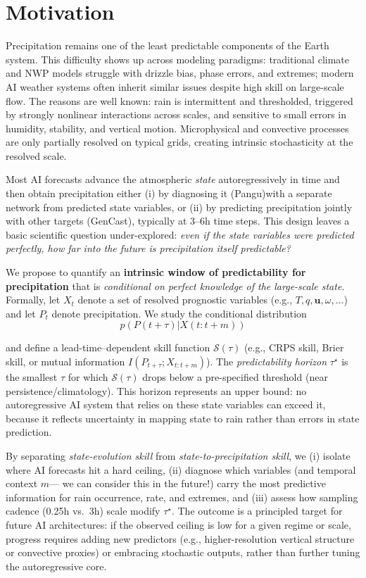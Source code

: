 \documentclass{article}
\begin{document}
\section{Motivation}
Precipitation remains one of the least predictable components of the Earth system. This difficulty shows up across modeling paradigms: traditional climate and NWP models struggle with drizzle bias, phase errors, and extremes; modern AI weather systems often inherit similar issues despite high skill on large-scale flow. The reasons are well known: rain is intermittent and thresholded, triggered by strongly nonlinear interactions across scales, and sensitive to small errors in humidity, stability, and vertical motion. Microphysical and convective processes are only partially resolved on typical grids, creating intrinsic stochasticity at the resolved scale.

Most AI forecasts advance the atmospheric \emph{state} autoregressively in time and then obtain precipitation either (i) by diagnosing it (Pangu)with a separate network from predicted state variables, or (ii) by predicting precipitation jointly with other targets (GenCast), typically at 3–6h time steps. This design leaves a basic scientific question under-explored: \emph{even if the state variables were predicted perfectly, how far into the future is precipitation itself predictable?}

We propose to quantify an \textbf{intrinsic window of predictability for precipitation} that is \emph{conditional on perfect knowledge of the large-scale state}. Formally, let $X_t$ denote a set of resolved prognostic variables (e.g., ${T,q,\mathbf{u},\omega,  \ldots}$) and let $P_t$ denote precipitation. We study the conditional distribution
\[p(P(t+\tau)| X(t:t+m))\]

and define a lead-time–dependent skill function $\mathcal{S}(\tau)$ (e.g., CRPS skill, Brier skill, or mutual information $I(P_{t+\tau};X_{t:t+m})$). The \emph{predictability horizon} $\tau^\star$ is the smallest $\tau$ for which $\mathcal{S}(\tau)$ drops below a pre-specified threshold (near persistence/climatology). This horizon represents an upper bound: no autoregressive AI system that relies on these state variables can exceed it, because it reflects uncertainty in mapping state to rain rather than errors in state prediction.

By separating \emph{state-evolution skill} from \emph{state-to-precipitation skill}, we (i) isolate where AI forecasts hit a hard ceiling, (ii) diagnose which variables (and temporal context $m$--- we can consider this in the future!) carry the most predictive information for rain occurrence, rate, and extremes, and (iii) assess how sampling cadence (0.25h vs.\ 3h) scale modify $\tau^\star$. The outcome is a principled target for future AI architectures: if the observed ceiling is low for a given regime or scale, progress requires adding new predictors (e.g., higher-resolution vertical structure or convective proxies) or embracing stochastic outputs, rather than further tuning the autoregressive core.
\end{document}
